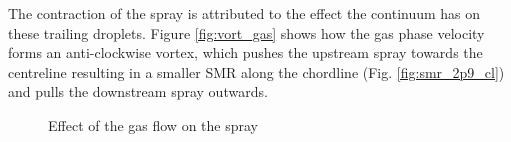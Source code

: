 \documentclass[a4paper,10pt]{article}
\begin{document}
The contraction of the spray is attributed to the effect the continuum has on these trailing droplets. Figure \ref{fig:vort_gas} shows how the gas phase velocity forms an anti-clockwise vortex, which pushes the upstream spray towards the centreline resulting in a smaller SMR along the chordline (Fig. \ref{fig:smr_2p9_cl}) and pulls the downstream spray outwards.
\begin{figure}[H]
\centering
{}
\caption{Effect of the gas flow on the spray}
\end{figure}
\end{document}
